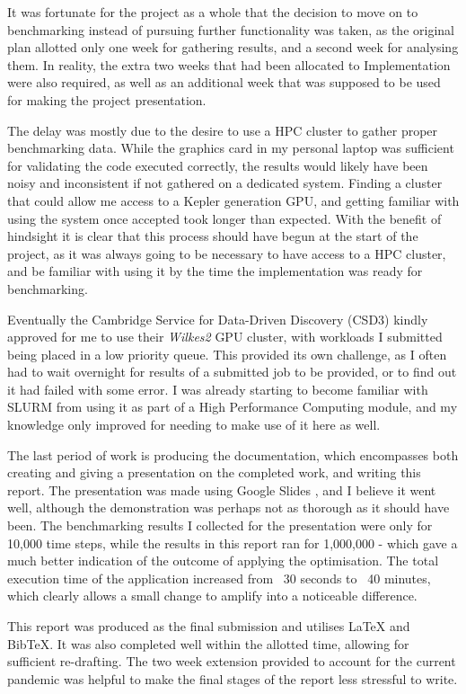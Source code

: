 It was fortunate for the project as a whole that the decision to move on to benchmarking instead of pursuing further functionality was taken, as the original plan allotted only one week for gathering results, and a second week for analysing them. In reality, the extra two weeks that had been allocated to Implementation were also required, as well as an additional week that was supposed to be used for making the project presentation.
\par
The delay was mostly due to the desire to use a HPC cluster to gather proper benchmarking data. While the graphics card in my personal laptop was sufficient for validating the code executed correctly, the results would likely have been noisy and inconsistent if not gathered on a dedicated system. Finding a cluster that could allow me access to a Kepler generation GPU, and getting familiar with using the system once accepted took longer than expected. With the benefit of hindsight it is clear that this process should have begun at the start of the project, as it was always going to be necessary to have access to a HPC cluster, and be familiar with using it by the time the implementation was ready for benchmarking.
\par
Eventually the Cambridge Service for Data-Driven Discovery (CSD3) kindly approved for me to use their \textit{Wilkes2} GPU cluster, with workloads I submitted being placed in a low priority queue. This provided its own challenge, as I often had to wait overnight for results of a submitted job to be provided, or to find out it had failed with some error. I was already starting to become familiar with SLURM from using it as part of a High Performance Computing module, and my knowledge only improved for needing to make use of it here as well.

The last period of work is producing the documentation, which encompasses both creating and giving a presentation on the completed work, and writing this report. The presentation was made using Google Slides \cite{gslides}, and I believe it went well, although the demonstration was perhaps not as thorough as it should have been. The benchmarking results I collected for the presentation were only for 10,000 time steps, while the results in this report ran for 1,000,000 - which gave a much better indication of the outcome of applying the optimisation. The total execution time of the application increased from ~30 seconds to ~40 minutes, which clearly allows a small change to amplify into a noticeable difference.
\par
This report was produced as the final submission and utilises LaTeX and BibTeX. It was also completed well within the allotted time, allowing for sufficient re-drafting. The two week extension provided to account for the current pandemic was helpful to make the final stages of the report less stressful to write.

